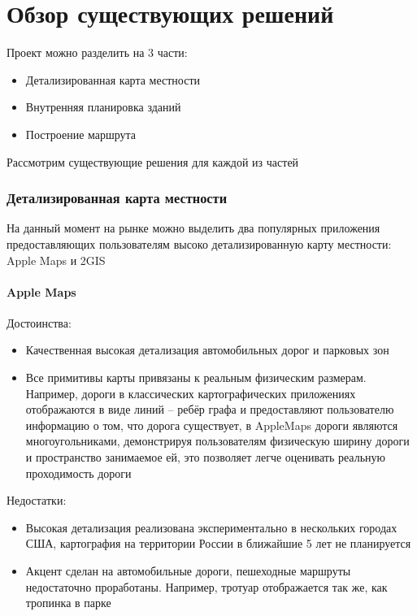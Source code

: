   \section{Обзор существующих решений}
    Проект можно разделить на 3 части:
    \begin{itemize}
      \item Детализированная карта местности
      \item Внутренняя планировка зданий
      \item Построение маршрута
    \end{itemize}


    Рассмотрим существующие решения для каждой из частей

    \subsubsection{Детализированная карта местности}
      На данный момент на рынке можно выделить два популярных приложения предоставляющих пользователям высоко детализированную карту местности: Apple Maps и 2GIS
      \paragraph{Apple Maps}
        \noindent Достоинства:
        \begin{itemize}
          \item Качественная высокая детализация автомобильных дорог и парковых зон
          \item Все примитивы карты привязаны к реальным физическим размерам. Например, дороги в классических картографических приложениях отображаются в виде линий -- ребёр графа и предоставляют пользователю информацию о том, что дорога существует, в AppleMaps дороги являются многоугольниками, демонстрируя пользователям физическую ширину дороги и пространство занимаемое ей, это позволяет легче оценивать реальную проходимость дороги
        \end{itemize}

        \noindent Недостатки:
        \begin{itemize}
          \item Высокая детализация реализована экспериментально в нескольких городах США, картография на территории России в ближайшие 5 лет не планируется
          \item Акцент сделан на автомобильные дороги, пешеходные маршруты недостаточно проработаны. Например, тротуар отображается так же, как тропинка в парке
        \end{itemize}

